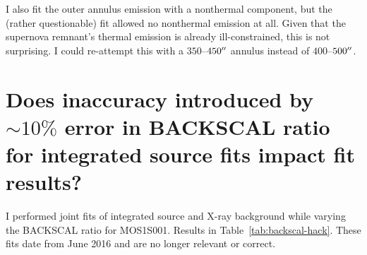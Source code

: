 \documentclass[twocolumn,tighten,trackchanges]{aastex61}
\newcommand*{\abt}{\mathord{\sim}} %
\begin{document}
I also fit the outer annulus emission with a nonthermal component, but the
(rather questionable) fit allowed no nonthermal emission at all.
Given that the supernova remnant's thermal emission is already ill-constrained,
this is not surprising.
I could re-attempt this with a $350$--$450\mbox{$^{\prime\prime}$}$ annulus instead of
$400$--$500\mbox{$^{\prime\prime}$}$.  %

\begin{figure*}[!hb]
    \label{fig:nonthermal}
\end{figure*}


\clearpage
\section{Does inaccuracy introduced by $\abt 10\%$ error in BACKSCAL ratio for
integrated source fits impact fit results?}

I performed joint fits of integrated source and X-ray background while
varying the BACKSCAL ratio for MOS1S001.
Results in Table~\ref{tab:backscal-hack}.
These fits date from June 2016 and are no longer relevant or correct.
\end{document}
